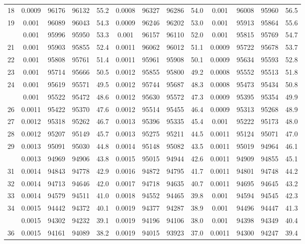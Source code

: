 \documentclass[
  14pt,
]{article}
\begin{document}
\begin{longtable}[t]{lcccccccccccc}
18 & 0.0009 & 96176 & 96132 & 55.2 & 0.0008 & 96327 & 96286 & 54.0 & 0.001 & 96008 & 95960 & 56.5\\
19 & 0.001 & 96089 & 96043 & 54.3 & 0.0009 & 96246 & 96202 & 53.0 & 0.001 & 95913 & 95864 & 55.6\\
\addlinespace
20 & 0.001 & 95996 & 95950 & 53.3 & 0.001 & 96157 & 96110 & 52.0 & 0.001 & 95815 & 95769 & 54.7\\
21 & 0.001 & 95903 & 95855 & 52.4 & 0.0011 & 96062 & 96012 & 51.1 & 0.0009 & 95722 & 95678 & 53.7\\
22 & 0.001 & 95808 & 95761 & 51.4 & 0.0011 & 95961 & 95908 & 50.1 & 0.0009 & 95634 & 95593 & 52.8\\
23 & 0.001 & 95714 & 95666 & 50.5 & 0.0012 & 95855 & 95800 & 49.2 & 0.0008 & 95552 & 95513 & 51.8\\
24 & 0.001 & 95619 & 95571 & 49.5 & 0.0012 & 95744 & 95687 & 48.3 & 0.0008 & 95473 & 95434 & 50.8\\
\addlinespace
25 & 0.001 & 95522 & 95472 & 48.6 & 0.0012 & 95630 & 95572 & 47.3 & 0.0009 & 95395 & 95354 & 49.9\\
26 & 0.0011 & 95422 & 95370 & 47.6 & 0.0012 & 95514 & 95455 & 46.4 & 0.0009 & 95313 & 95268 & 48.9\\
27 & 0.0012 & 95318 & 95262 & 46.7 & 0.0013 & 95396 & 95335 & 45.4 & 0.001 & 95222 & 95173 & 48.0\\
28 & 0.0012 & 95207 & 95149 & 45.7 & 0.0013 & 95275 & 95211 & 44.5 & 0.0011 & 95124 & 95071 & 47.0\\
29 & 0.0013 & 95091 & 95030 & 44.8 & 0.0014 & 95148 & 95082 & 43.5 & 0.0011 & 95019 & 94964 & 46.1\\
\addlinespace
30 & 0.0013 & 94969 & 94906 & 43.8 & 0.0015 & 95015 & 94944 & 42.6 & 0.0011 & 94909 & 94855 & 45.1\\
31 & 0.0014 & 94843 & 94778 & 42.9 & 0.0016 & 94872 & 94795 & 41.7 & 0.0011 & 94801 & 94748 & 44.2\\
32 & 0.0014 & 94713 & 94646 & 42.0 & 0.0017 & 94718 & 94635 & 40.7 & 0.0011 & 94695 & 94645 & 43.2\\
33 & 0.0014 & 94579 & 94511 & 41.0 & 0.0018 & 94552 & 94465 & 39.8 & 0.001 & 94594 & 94545 & 42.3\\
34 & 0.0015 & 94442 & 94372 & 40.1 & 0.0019 & 94377 & 94287 & 38.9 & 0.001 & 94496 & 94447 & 41.3\\
\addlinespace
35 & 0.0015 & 94302 & 94232 & 39.1 & 0.0019 & 94196 & 94106 & 38.0 & 0.001 & 94398 & 94349 & 40.4\\
36 & 0.0015 & 94161 & 94089 & 38.2 & 0.0019 & 94015 & 93923 & 37.0 & 0.0011 & 94300 & 94247 & 39.4\\

\end{longtable}
\end{document}
